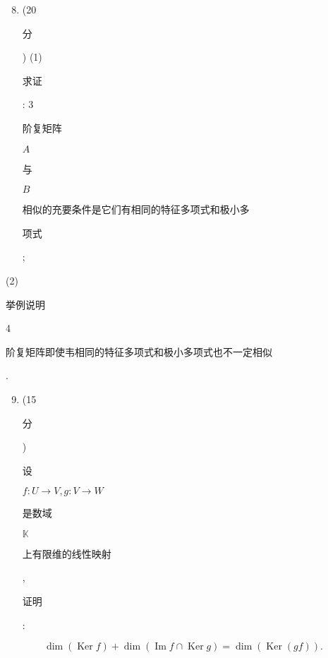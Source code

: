 \documentclass[10pt]{article}
\begin{document}
\begin{enumerate}
  \setcounter{enumi}{7}
  \item (20 \begin{CJK}{UTF8}{mj}分\end{CJK}) (1) \begin{CJK}{UTF8}{mj}求证\end{CJK}: 3 \begin{CJK}{UTF8}{mj}阶复矩阵\end{CJK} $A$ \begin{CJK}{UTF8}{mj}与\end{CJK} $B$ \begin{CJK}{UTF8}{mj}相似的充要条件是它们有相同的特征多项式和极小多\end{CJK} \begin{CJK}{UTF8}{mj}项式\end{CJK};
\end{enumerate}
(2) \begin{CJK}{UTF8}{mj}挙例说明\end{CJK} 4 \begin{CJK}{UTF8}{mj}阶复矩阵即使韦相同的特征多项式和极小多项式也不一定相似\end{CJK}.

\begin{enumerate}
  \setcounter{enumi}{8}
  \item (15 \begin{CJK}{UTF8}{mj}分\end{CJK}) \begin{CJK}{UTF8}{mj}设\end{CJK} $f: U \rightarrow V, g: V \rightarrow W$ \begin{CJK}{UTF8}{mj}是数域\end{CJK} $\mathbb{K}$ \begin{CJK}{UTF8}{mj}上有限维的线性映射\end{CJK}, \begin{CJK}{UTF8}{mj}证明\end{CJK}:
\end{enumerate}
$$
\operatorname{dim}(\operatorname{Ker} f)+\operatorname{dim}(\operatorname{Im} f \cap \operatorname{Ker} g)=\operatorname{dim}(\operatorname{Ker}(g f)) .
$$
\end{document}

